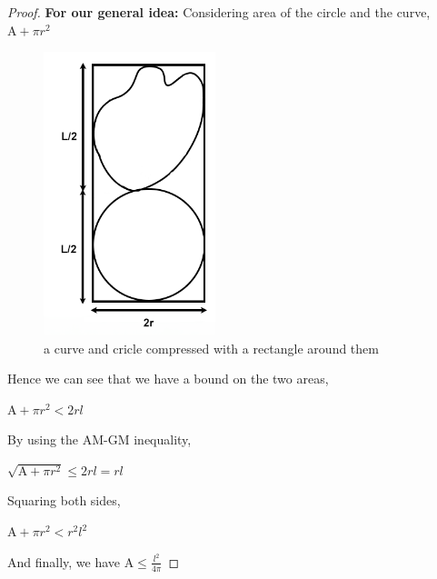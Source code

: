 \documentclass[a4paper]{book}
\numberwithin{theorem}{section}%
\begin{document}
\begin{proof}
    \textbf{For our general idea:} Considering area of the circle and the curve, $\displaystyle \mathrm{A}+\pi r^{2}$
    \begin{figure}[hbt!]
        \begin{center}   
            \includegraphics[width=50mm]{esfigure2}
            \caption{a curve and cricle compressed with a rectangle around them}
        \end{center}
    \end{figure}\leavevmode
    \newline
    Hence we can see that we have a bound on the two areas,
    \begin{center}
        $\displaystyle \mathrm{A}+\pi r^{2}<2rl$
    \end{center}
    By using the AM-GM inequality,
    \begin{center}
        $\displaystyle \sqrt{\mathrm{A}+\pi r^{2}}\leq2rl=rl$
    \end{center}
    Squaring both sides,
    \begin{center}
        $\displaystyle \mathrm{A}+\pi r^{2}<r^{2}l^{2}$
    \end{center}
    And finally, we have $\displaystyle \mathrm{A}\leq\frac{l^2}{4\pi}$


\end{proof}
\end{document}
